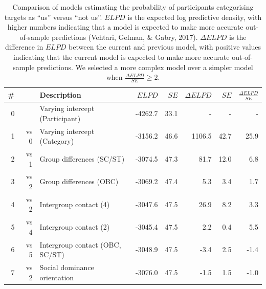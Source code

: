 \documentclass[12pt, a4paper]{article}
\begin{document}
\begin{table}
\caption{
Comparison of models estimating the probability of participants categorising targets as ``us'' versus ``not us''. $\textit{ELPD}$ is the expected log predictive density, with higher numbers indicating that a model is expected to make more accurate out-of-sample predictions (Vehtari, Gelman, \& Gabry, 2017). $\Delta\textit{ELPD}$ is the difference in $\textit{ELPD}$ between the current and previous model, with positive values indicating that the current model is expected to make more accurate out-of-sample predictions. We selected a more complex model over a simpler model when $\frac{\Delta\textit{ELPD}}{\textit{SE}} \geq 2$. %
}
\centering
{}
\small	
\begin{tabularx}{\linewidth}{r@{~}rXrrrrr} \toprule
\# &  & Description & $\textit{ELPD}$ & $\textit{SE}$ & $\Delta\textit{ELPD}$ & $\textit{SE}$ & $\frac{\Delta\textit{ELPD}}{\textit{SE}}$ \\ \midrule 
0 &      & Varying intercept (Participant) & -4262.7 & 33.1 & - & - & - \\
1 & vs 0 & Varying intercept (Category) & -3156.2 & 46.6 & 1106.5 & 42.7 & 25.9 \\
2 & vs 1 & Group differences (SC/ST) & -3074.5 & 47.3 &   81.7 & 12.0 &  6.8 \\
3 & vs 2 & Group differences (OBC) & -3069.2 & 47.4 &    5.3 &  3.4 &  1.7 \\ \midrule
4 & vs 2 & Intergroup contact (4) & -3047.6 & 47.5 &   26.9 &  8.2 &  3.3 \\
5 & vs 4 & Intergroup contact (2) & -3045.4 & 47.5 &    2.2 &  0.4 &  5.5 \\
6 & vs 5 & Intergroup contact (OBC, SC/ST) & -3048.9 & 47.5 &   -3.4 &  2.5 & -1.4 \\
7 & vs 2 & Social dominance orientation & -3076.0 & 47.5 &   -1.5 &  1.5 & -1.0 \\
\bottomrule
\end{tabularx}
\label{tab:t2}
\end{table}
\end{document}
